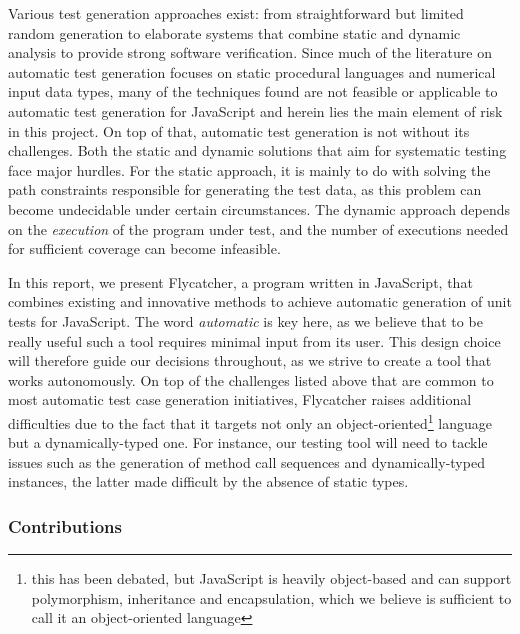 Various test generation approaches exist: from straightforward but limited random generation to elaborate systems that combine static and dynamic analysis to provide strong software verification. Since much of the literature on automatic test generation focuses on static procedural languages and numerical input data types, many of the techniques found are not feasible or applicable to automatic test generation for JavaScript and herein lies the main element of risk in this project. On top of that, automatic test generation is not without its challenges. Both the static and dynamic solutions that aim for systematic testing face major hurdles. For the static approach, it is mainly to do with solving the path constraints responsible for generating the test data, as this problem can become undecidable under certain circumstances. The dynamic approach depends on the \emph{execution} of the program under test, and the number of executions needed for sufficient coverage can become infeasible.

In this report, we present \textsf{Flycatcher}, a program written in JavaScript, that combines existing and innovative methods to achieve automatic generation of unit tests for JavaScript. The word \emph{automatic} is key here, as we believe that to be really useful such a tool requires minimal input from its user. This design choice will therefore guide our decisions throughout, as we strive to create a tool that works autonomously. On top of the challenges listed above that are common to most automatic test case generation initiatives, \textsf{Flycatcher} raises additional difficulties due to the fact that it targets not only an object-oriented\footnote{this has been debated, but JavaScript is heavily object-based and can support polymorphism, inheritance and encapsulation, which we believe is sufficient to call it an object-oriented language} language but a dynamically-typed one. For instance, our testing tool will need to tackle issues such as the generation of method call sequences and dynamically-typed instances, the latter made difficult by the absence of static types.

\subsubsection{Contributions}

